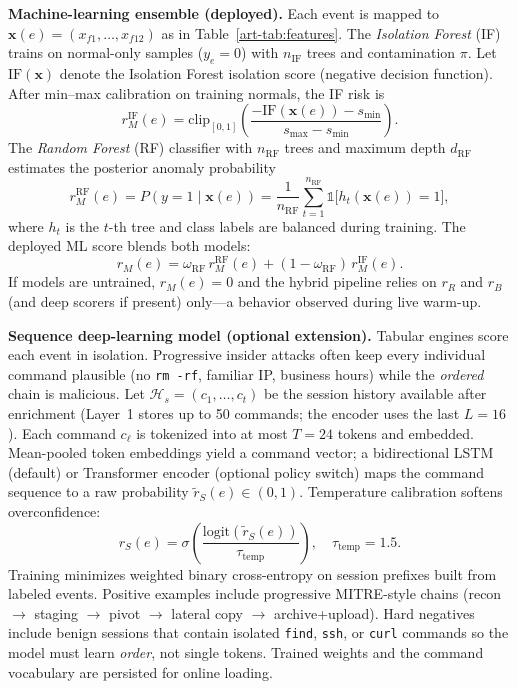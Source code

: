 \textbf{Machine-learning ensemble (deployed).} Each event is mapped to $\mathbf{x}(e)=(x_{f1},\ldots,x_{f12})$ as in Table~\ref{art-tab:features}. The \textit{Isolation Forest} (IF) trains on normal-only samples ($y_e=0$) with $n_{\mathrm{IF}}$ trees and contamination $\pi$. Let $\mathrm{IF}(\mathbf{x})$ denote the Isolation Forest isolation score (negative decision function). After min--max calibration on training normals, the IF risk is
\begin{equation}
r_M^{\mathrm{IF}}(e) = \mathrm{clip}_{[0,1]}\!\left(\frac{-\mathrm{IF}(\mathbf{x}(e))-s_{\min}}{s_{\max}-s_{\min}}\right).
\tag{3.1}
\end{equation}
The \textit{Random Forest} (RF) classifier with $n_{\mathrm{RF}}$ trees and maximum depth $d_{\mathrm{RF}}$ estimates the posterior anomaly probability
\begin{equation}
r_M^{\mathrm{RF}}(e) = P(y{=}1\mid \mathbf{x}(e)) = \frac{1}{n_{\mathrm{RF}}}\sum_{t=1}^{n_{\mathrm{RF}}} \mathbb{1}\bigl[h_t(\mathbf{x}(e)){=}1\bigr],
\tag{3.2}
\end{equation}
where $h_t$ is the $t$-th tree and class labels are balanced during training. The deployed ML score blends both models:
\begin{equation}
r_M(e) = \omega_{\mathrm{RF}}\, r_M^{\mathrm{RF}}(e) + (1-\omega_{\mathrm{RF}})\, r_M^{\mathrm{IF}}(e).
\tag{3.3}
\end{equation}
If models are untrained, $r_M(e)=0$ and the hybrid pipeline relies on $r_R$ and $r_B$ (and deep scorers if present) only---a behavior observed during live warm-up.

\textbf{Sequence deep-learning model (optional extension).}
Tabular engines score each event in isolation. Progressive insider attacks often keep every individual command plausible (no \texttt{rm -rf}, familiar IP, business hours) while the \textit{ordered} chain is malicious. Let $\mathcal{H}_s=(c_1,\ldots,c_t)$ be the session history available after enrichment (Layer~1 stores up to 50 commands; the encoder uses the last $L{=}16$). Each command $c_\ell$ is tokenized into at most $T{=}24$ tokens and embedded. Mean-pooled token embeddings yield a command vector; a bidirectional LSTM (default) or Transformer encoder (optional policy switch) maps the command sequence to a raw probability $\tilde{r}_S(e)\in(0,1)$. Temperature calibration softens overconfidence:
\begin{equation}
r_S(e)=\sigma\!\left(\frac{\mathrm{logit}(\tilde{r}_S(e))}{\tau_{\mathrm{temp}}}\right),
\quad \tau_{\mathrm{temp}}=1.5.
\tag{3.4}
\end{equation}
Training minimizes weighted binary cross-entropy on session prefixes built from labeled events. Positive examples include progressive MITRE-style chains (recon $\rightarrow$ staging $\rightarrow$ pivot $\rightarrow$ lateral copy $\rightarrow$ archive+upload). Hard negatives include benign sessions that contain isolated \texttt{find}, \texttt{ssh}, or \texttt{curl} commands so the model must learn \textit{order}, not single tokens. Trained weights and the command vocabulary are persisted for online loading.

